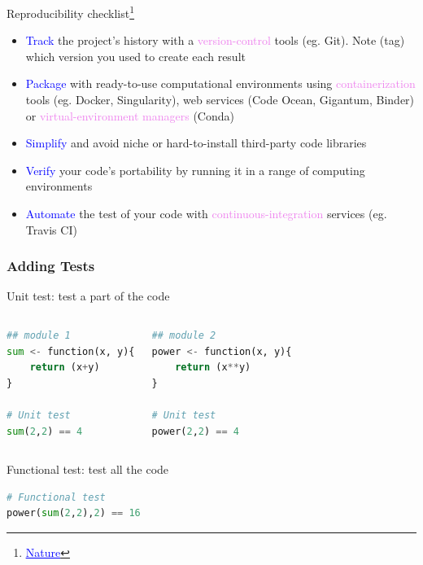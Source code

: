 \begin{frame}{Reproducibility checklist\footnote{\href{https://www.nature.com/articles/d41586-020-02462-7}{\textcolor{blue}{\underline{Nature}}}}}

\begin{itemize}
    \item \textcolor{blue}{Track} the project’s history with a \textcolor{violet}{version-control} tools (eg. Git). Note (tag) which version you used to create each result
    \item \textcolor{blue}{Package} with ready-to-use computational environments using \textcolor{violet}{containerization} tools (eg. Docker, Singularity), web services (Code Ocean, Gigantum, Binder) or \textcolor{violet}{virtual-environment managers} (Conda)
    \item \textcolor{blue}{Simplify} and avoid niche or hard-to-install third-party code libraries
    \item \textcolor{blue}{Verify} your code’s portability by running it in a range of computing environments
    \item \textcolor{blue}{Automate} the test of your code with \textcolor{violet}{continuous-integration} services (eg. Travis CI)
\end{itemize}
\end{frame}    
\begin{frame}[containsverbatim]
\frametitle{Adding Tests}
\begin{block}{Unit test: test a part of the code}
\begin{columns}
\begin{lstlisting}[language=python]
## module 1
sum <- function(x, y){
    return (x+y)
}

# Unit test
sum(2,2) == 4
\end{lstlisting}
\begin{lstlisting}[language=python]
## module 2
power <- function(x, y){
    return (x**y)
}

# Unit test
power(2,2) == 4
\end{lstlisting}
\end{columns}
\end{block}
\begin{block}{Functional test: test all the code}
\begin{lstlisting}[language=python]
# Functional test
power(sum(2,2),2) == 16
\end{lstlisting}
\end{block}
\end{frame}

